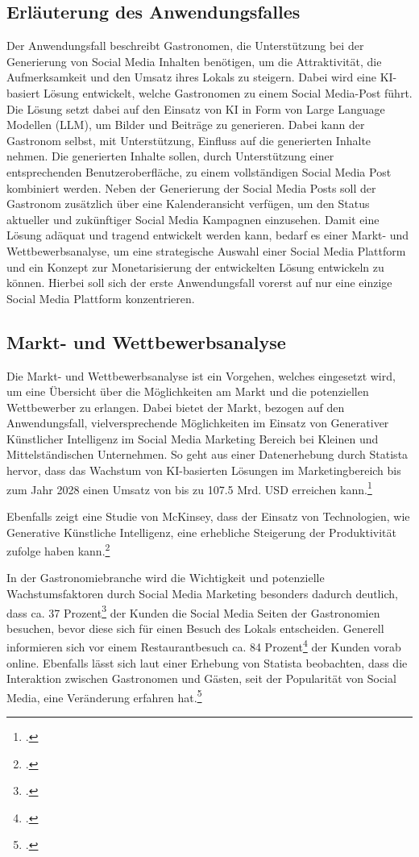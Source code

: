 \subsection{Erläuterung des Anwendungsfalles}
Der Anwendungsfall beschreibt Gastronomen, die Unterstützung bei der Generierung von Social Media Inhalten benötigen, um die Attraktivität, die Aufmerksamkeit und den Umsatz ihres Lokals zu steigern.
Dabei wird eine KI-basiert Lösung entwickelt, welche Gastronomen zu einem Social Media-Post führt.
Die Lösung setzt dabei auf den Einsatz von KI in Form von Large Language Modellen (LLM), um Bilder und Beiträge zu generieren.
Dabei kann der Gastronom selbst, mit Unterstützung, Einfluss auf die generierten Inhalte nehmen.
Die generierten Inhalte sollen, durch Unterstützung einer entsprechenden Benutzeroberfläche, zu einem vollständigen Social Media Post kombiniert werden.
Neben der Generierung der Social Media Posts soll der Gastronom zusätzlich über eine Kalenderansicht verfügen, um den Status aktueller und zukünftiger Social Media Kampagnen einzusehen.
Damit eine Lösung adäquat und tragend entwickelt werden kann, bedarf es einer Markt- und Wettbewerbsanalyse, um eine strategische Auswahl einer Social Media Plattform und ein Konzept zur Monetarisierung der entwickelten Lösung entwickeln zu können.
Hierbei soll sich der erste Anwendungsfall vorerst auf nur eine einzige Social Media Plattform konzentrieren.

\subsection{Markt- und Wettbewerbsanalyse}
Die Markt- und Wettbewerbsanalyse ist ein Vorgehen, welches eingesetzt wird, um eine Übersicht über die Möglichkeiten am Markt und die potenziellen Wettbewerber zu erlangen.
Dabei bietet der Markt, bezogen auf den Anwendungsfall, vielversprechende Möglichkeiten im Einsatz von Generativer Künstlicher Intelligenz im Social Media Marketing Bereich bei Kleinen und Mittelständischen Unternehmen.
So geht aus einer Datenerhebung durch Statista hervor, dass das Wachstum von KI-basierten Lösungen im Marketingbereich bis zum Jahr 2028 einen Umsatz von bis zu 107.5 Mrd. USD erreichen kann.\footcite{statista_ai_marketing_europe}

Ebenfalls zeigt eine Studie von McKinsey, dass der Einsatz von Technologien, wie Generative Künstliche Intelligenz, eine erhebliche Steigerung der Produktivität zufolge haben kann.\footcite{mckinsey_genai_marketing}

In der Gastronomiebranche wird die Wichtigkeit und potenzielle Wachstumsfaktoren durch Social Media Marketing besonders dadurch deutlich, dass ca. 37 Prozent\footcite{apicbase_gastro_fakten} der Kunden die Social Media Seiten der Gastronomien besuchen, bevor diese sich für einen Besuch des Lokals entscheiden.
Generell informieren sich vor einem Restaurantbesuch ca. 84 Prozent\footcite{g_wie_gastro_trends_2024} der Kunden vorab online.
Ebenfalls lässt sich laut einer Erhebung von Statista beobachten, dass die Interaktion zwischen Gastronomen und Gästen, seit der Popularität von Social Media, eine Veränderung erfahren hat.\footcite{statista_social_media_gastgewerbe}

